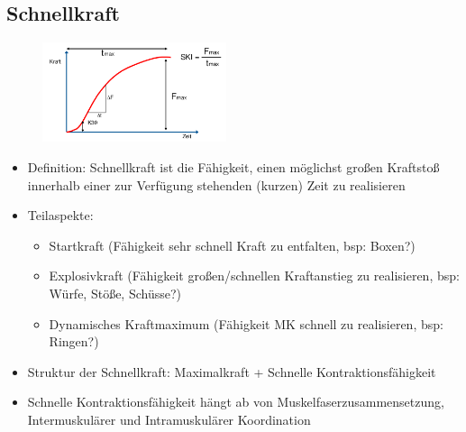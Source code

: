 \subsection{Schnellkraft}

\begin{figure}
  \begin{center}
    \includegraphics[width=0.48\textwidth]{pictures/kraftanstiegskurve}
  \end{center}
\end{figure}

\begin{itemize}
    \item Definition: Schnellkraft ist die Fähigkeit, einen möglichst großen Kraftstoß innerhalb einer zur Verfügung stehenden (kurzen) Zeit zu realisieren
    \item Teilaspekte:
    \begin{itemize}
        \item Startkraft (Fähigkeit sehr schnell Kraft zu entfalten, bsp: Boxen?)
        \item Explosivkraft (Fähigkeit großen/schnellen Kraftanstieg zu realisieren, bsp: Würfe, Stöße, Schüsse?)
        \item Dynamisches Kraftmaximum (Fähigkeit MK schnell zu realisieren, bsp: Ringen?)
    \end{itemize}
    \item Struktur der Schnellkraft: Maximalkraft + Schnelle Kontraktionsfähigkeit
    \item Schnelle Kontraktionsfähigkeit hängt ab von Muskelfaserzusammensetzung, Intermuskulärer und Intramuskulärer Koordination
\end{itemize}

